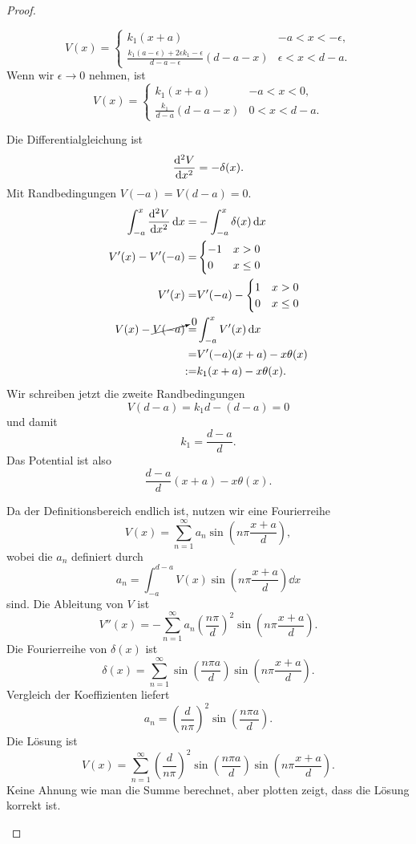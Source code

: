 \begin{proof}
\begin{parts}
\[
V(x)=\begin{cases}
	k_1(x + a) & -a < x < -\epsilon,\\
	\frac{k_1(a-\epsilon)+2\epsilon k_1 - \epsilon}{d-a-\epsilon}(d-a-x) & \epsilon < x < d-a.
\end{cases}
\]
Wenn wir $\epsilon\to 0$ nehmen, ist
\[
V(x) = \begin{cases}
	k_1(x+a) & -a < x < 0, \\
	\frac{k_1}{d-a}(d-a-x) & 0 < x < d-a.
\end{cases}
\] 
\item Die Differentialgleichung ist
	\[
		\dv[2]{V}{x}=-\delta(x)
	.\] 
Mit Randbedingungen $V(-a)=V(d-a)=0$.
\begin{align*}
	\int_{-a}^x \dv[2]{V}{x}\dd{x}=&-\int_{-a}^x \delta(x)\dd{x}\\
	V'(x)-V'(-a)=&\begin{cases}
		-1 & x > 0\\
		0 & x\le 0
	\end{cases}\\
		V'(x)=&V'(-a)-\begin{cases}
			1 & x > 0\\
			0 & x \le 0
		\end{cases}\\
			V(x) - \cancelto{0}{V(-a)} =& \int_{-a}^x V'(x) \dd{x}\\
			=& V'(-a)(x+a) - x\theta(x)\\
			:=& k_1(x+a)-x\theta(x).
\end{align*}
Wir schreiben jetzt die zweite Randbedingungen
\[
V(d-a)= k_1d - (d - a) = 0
\]
und damit
\[
k_1= \frac{d-a}{d}
.\] 
Das Potential ist also
\[
	\frac{d-a}{d}(x+a)- x\theta(x)
.\] 
\item Da der Definitionsbereich endlich ist, nutzen wir eine Fourierreihe
\[
	V(x)=\sum_{n=1}^\infty a_n\sin\left(n \pi \frac{x+a}{d}  \right) 
,\]
wobei die $a_n$ definiert durch
\[
	a_n = \int_{-a}^{d-a} V(x) \sin\left( n\pi \frac{x+a}{d} \right)\dd{x} 
\]
sind. Die Ableitung von $V$ ist
\[
	V''(x)=-\sum_{n=1}^\infty a_n \left( \frac{n\pi}{d} \right)^2 \sin\left( n\pi \frac{x+a}{d} \right) 
.\] 
Die Fourierreihe von $\delta(x)$ ist
\[
	\delta(x)=\sum_{n=1}^\infty \sin\left( \frac{n\pi a}{d} \right)\sin\left( n\pi \frac{x+a}{d} \right)  
.\] 
Vergleich der Koeffizienten liefert
\[
a_n = \left( \frac{d}{n\pi} \right)^2 \sin\left( \frac{n\pi a}{d} \right) 
.\] 
Die Lösung ist
\[
	V(x) =   \sum_{n=1}^\infty \left( \frac{d}{n\pi} \right)^2 \sin\left( \frac{n\pi a}{d} \right) \sin\left( n\pi \frac{x+a}{d} \right)  
.\] 
Keine Ahnung wie man die Summe berechnet, aber plotten zeigt, dass die Lösung korrekt ist.\qedhere


\end{parts}
\end{proof}
